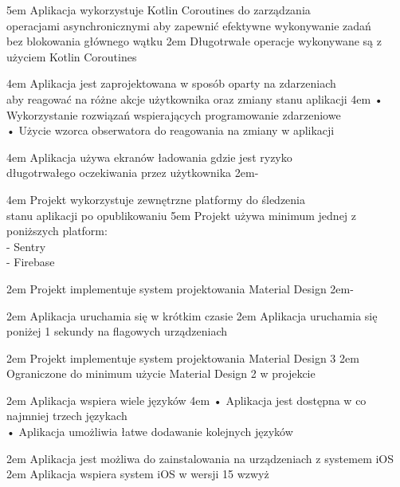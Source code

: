 {5em}{
    Aplikacja wykorzystuje Kotlin Coroutines do zarządzania\\
    operacjami asynchronicznymi aby zapewnić efektywne wykonywanie zadań\\
    bez blokowania głównego wątku
}
{2em}{
    Długotrwałe operacje wykonywane są z użyciem Kotlin Coroutines
}

{4em}{
    Aplikacja jest zaprojektowana w sposób oparty na zdarzeniach\\
    aby reagować na różne akcje użytkownika oraz zmiany stanu aplikacji
}
{4em}{
    • Wykorzystanie rozwiązań wspierających programowanie zdarzeniowe\\
    • Użycie wzorca obserwatora do reagowania na zmiany w aplikacji
}

{4em}{
    Aplikacja używa ekranów ładowania gdzie jest ryzyko\\
    długotrwałego oczekiwania przez użytkownika
}
{2em}{-}

{4em}{
    Projekt wykorzystuje zewnętrzne platformy do śledzenia\\
    stanu aplikacji po opublikowaniu
}
{5em}{
    Projekt używa minimum jednej z poniższych platform:\\
    - Sentry\\
    - Firebase
}

{2em}{
    Projekt implementuje system projektowania Material Design
}
{2em}{-}

{2em}{
    Aplikacja uruchamia się w krótkim czasie
}
{2em}{
    Aplikacja uruchamia się poniżej 1 sekundy na flagowych urządzeniach
}

{2em}{
    Projekt implementuje system projektowania Material Design 3
}
{2em}{
    Ograniczone do minimum użycie Material Design 2 w projekcie
}

{2em}{
    Aplikacja wspiera wiele języków
}
{4em}{
    • Aplikacja jest dostępna w co najmniej trzech językach\\
    • Aplikacja umożliwia łatwe dodawanie kolejnych języków
}

{2em}{
    Aplikacja jest możliwa do zainstalowania na urządzeniach z systemem iOS
}
{2em}{
    Aplikacja wspiera system iOS w wersji 15 wzwyż
}


